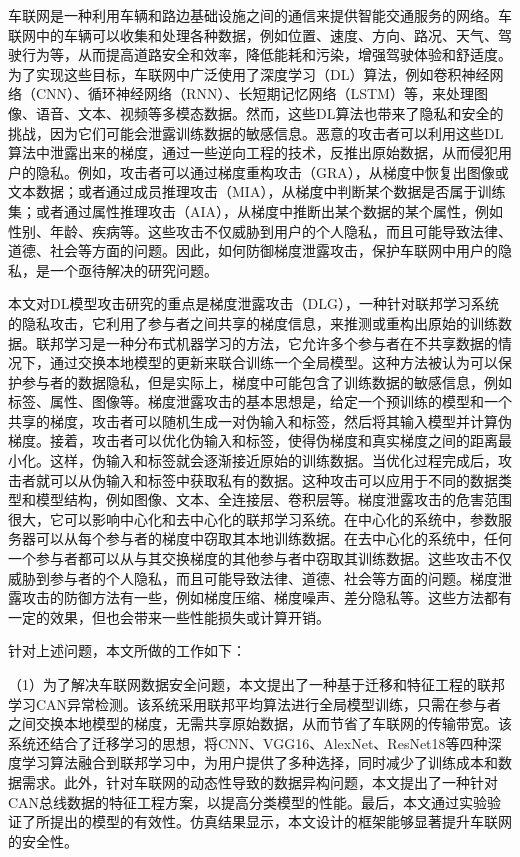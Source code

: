 车联网是一种利用车辆和路边基础设施之间的通信来提供智能交通服务的网络。车联网中的车辆可以收集和处理各种数据，例如位置、速度、方向、路况、天气、驾驶行为等，从而提高道路安全和效率，降低能耗和污染，增强驾驶体验和舒适度。为了实现这些目标，车联网中广泛使用了深度学习（DL）算法，例如卷积神经网络（CNN）、循环神经网络（RNN）、长短期记忆网络（LSTM）等，来处理图像、语音、文本、视频等多模态数据。然而，这些DL算法也带来了隐私和安全的挑战，因为它们可能会泄露训练数据的敏感信息。恶意的攻击者可以利用这些DL算法中泄露出来的梯度，通过一些逆向工程的技术，反推出原始数据，从而侵犯用户的隐私。例如，攻击者可以通过梯度重构攻击（GRA）\cite{Model_Inversion_Attacks_that_Exploit_Confidence_Information_and_Basic_Countermeasures}，从梯度中恢复出图像或文本数据；或者通过成员推理攻击（MIA）\cite{Membership_Inference_Attacks_Against_Machine_Learning_Models}，从梯度中判断某个数据是否属于训练集；或者通过属性推理攻击（AIA）\cite{Property_Inference_Attacks_on_Fully_Connected_Neural_Networks_using_Permutation_Invariant_Representations}，从梯度中推断出某个数据的某个属性，例如性别、年龄、疾病等。这些攻击不仅威胁到用户的个人隐私，而且可能导致法律、道德、社会等方面的问题。因此，如何防御梯度泄露攻击，保护车联网中用户的隐私，是一个亟待解决的研究问题。

本文对DL模型攻击研究的重点是梯度泄露攻击（DLG），一种针对联邦学习系统的隐私攻击，它利用了参与者之间共享的梯度信息，来推测或重构出原始的训练数据。联邦学习是一种分布式机器学习的方法，它允许多个参与者在不共享数据的情况下，通过交换本地模型的更新来联合训练一个全局模型。这种方法被认为可以保护参与者的数据隐私，但是实际上，梯度中可能包含了训练数据的敏感信息，例如标签、属性、图像等。梯度泄露攻击的基本思想是，给定一个预训练的模型和一个共享的梯度，攻击者可以随机生成一对伪输入和标签，然后将其输入模型并计算伪梯度。接着，攻击者可以优化伪输入和标签，使得伪梯度和真实梯度之间的距离最小化。这样，伪输入和标签就会逐渐接近原始的训练数据。当优化过程完成后，攻击者就可以从伪输入和标签中获取私有的数据。这种攻击可以应用于不同的数据类型和模型结构，例如图像、文本、全连接层、卷积层等。梯度泄露攻击的危害范围很大，它可以影响中心化和去中心化的联邦学习系统。在中心化的系统中，参数服务器可以从每个参与者的梯度中窃取其本地训练数据。在去中心化的系统中，任何一个参与者都可以从与其交换梯度的其他参与者中窃取其训练数据。这些攻击不仅威胁到参与者的个人隐私，而且可能导致法律、道德、社会等方面的问题。梯度泄露攻击的防御方法有一些，例如梯度压缩、梯度噪声、差分隐私等。这些方法都有一定的效果，但也会带来一些性能损失或计算开销。

针对上述问题，本文所做的工作如下：

（1）为了解决车联网数据安全问题，本文提出了一种基于迁移和特征工程的联邦学习CAN异常检测。该系统采用联邦平均算法进行全局模型训练，只需在参与者之间交换本地模型的梯度，无需共享原始数据，从而节省了车联网的传输带宽。该系统还结合了迁移学习的思想，将CNN、VGG16、AlexNet、ResNet18等四种深度学习算法融合到联邦学习中，为用户提供了多种选择，同时减少了训练成本和数据需求。此外，针对车联网的动态性导致的数据异构问题，本文提出了一种针对CAN总线数据的特征工程方案，以提高分类模型的性能。最后，本文通过实验验证了所提出的模型的有效性。仿真结果显示，本文设计的框架能够显著提升车联网的安全性。


